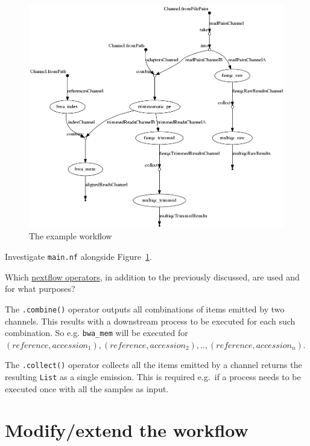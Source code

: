 \begin{figure}[H]
\centering
\includegraphics[width=\textwidth]{handout/flowchart.png}
\caption{The example workflow}
\label{fig:dag}
\end{figure}


\begin{questions}
Investigate \texttt{main.nf} alongside Figure~\ref{fig:dag}. 

Which \href{https://www.nextflow.io/docs/latest/operator.html}{nextflow operators}, in addition to the previously discussed, are used and for what purposes? 

\begin{answer}
The \texttt{.combine()} operator outputs all combinations of items emitted by two channels. This results with a downstream process to be executed for each such combination. So e.g. \texttt{bwa\_mem} will be executed for\\ $(reference, accession_1),(reference, accession_2),..,(reference, accession_n)$.

The \texttt{.collect()} operator collects all the items emitted by a channel returns the resulting \texttt{List} as a single emission. This is required e.g.\ if a process needs to be executed once with all the samples as input.
\end{answer}

\end{questions}


\section{Modify/extend the workflow}

